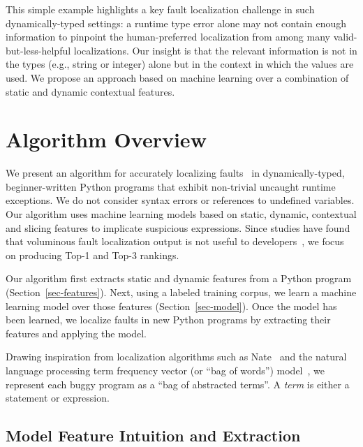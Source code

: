 \documentclass[conference]{IEEEtran}
\begin{document}
This simple example highlights a key fault localization challenge in such
dynamically-typed settings: a runtime type error alone may not contain
enough information to pinpoint the human-preferred localization from among
many valid-but-less-helpful localizations. Our insight is that the relevant
information is not in the types (e.g., string or integer) alone but in the
context in which the values are used.  We propose an approach based on
machine learning over a combination of static and dynamic contextual
features.


\section{Algorithm Overview}
\label{sec-algorithm}

We present an algorithm for accurately localizing faults~\cite{tarantula} in
dynamically-typed, beginner-written Python programs that exhibit
non-trivial uncaught runtime exceptions. We do not consider syntax errors
or references to undefined variables. Our algorithm uses machine learning
models based on static, dynamic, contextual and slicing features to
implicate suspicious expressions. Since studies have found that voluminous
fault localization output is not useful to
developers~\cite{orso-parnin,orso-parnin2015}, we focus on producing Top-1
and Top-3 rankings.

Our algorithm first extracts static and dynamic features from a Python
program (Section~\ref{sec-features}). Next, using a labeled training
corpus, we learn a machine learning model over those features
(Section~\ref{sec-model}). Once the model has been learned, we localize
faults in new Python programs by extracting their features and applying the
model.

Drawing inspiration from localization algorithms such as
Nate~\cite{learning-to-blame} and the natural language processing term
frequency vector (or ``bag of words'') model~\cite{Salton:1986:IMI:576628}, we represent
each buggy program as a ``bag of abstracted terms''. A \emph{term} is
either a statement or expression.

\subsection{Model Feature Intuition and Extraction}
\end{document}
